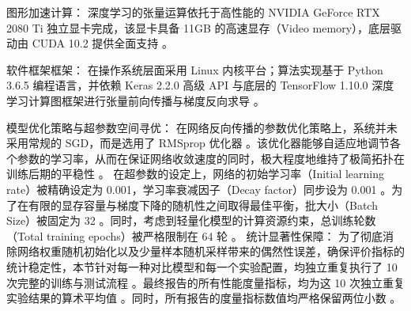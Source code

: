 图形加速计算： 深度学习的张量运算依托于高性能的 NVIDIA GeForce RTX 2080 Ti 独立显卡完成，该显卡具备 11GB 的高速显存（Video memory），底层驱动由 CUDA 10.2 提供全面支持 。


软件框架框架： 在操作系统层面采用 Linux 内核平台；算法实现基于 Python 3.6.5 编程语言，并依赖 Keras 2.2.0 高级 API 与底层的 TensorFlow 1.10.0 深度学习计算图框架进行张量前向传播与梯度反向求导 。

模型优化策略与超参数空间寻优：
在网络反向传播的参数优化策略上，系统并未采用常规的 SGD，而是选用了 RMSprop 优化器 。该优化器能够自适应地调节各个参数的学习率，从而在保证网络收敛速度的同时，极大程度地维持了极简拓扑在训练后期的平稳性 。
在超参数的设定上，网络的初始学习率（Initial learning rate）被精确设定为 0.001，学习率衰减因子（Decay factor）同步设为 0.001 。为了在有限的显存容量与梯度下降的随机性之间取得最佳平衡，批大小（Batch Size）被固定为 32 。同时，考虑到轻量化模型的计算资源约束，总训练轮数（Total training epochs）被严格限制在 64 轮 。
统计显著性保障：
为了彻底消除网络权重随机初始化以及少量样本随机采样带来的偶然性误差，确保评价指标的统计稳定性，本节针对每一种对比模型和每一个实验配置，均独立重复执行了 10 次完整的训练与测试流程 。最终报告的所有性能度量指标，均为这 10 次独立重复实验结果的算术平均值 。同时，所有报告的度量指标数值均严格保留两位小数 。

